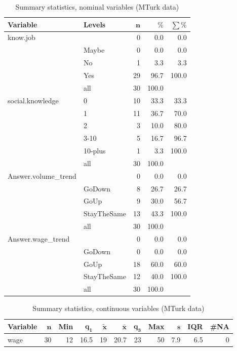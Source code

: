 \documentclass[a4paper,10pt]{article}\usepackage[]{graphicx}\usepackage[]{color}
\begin{document}
\begin{table}[ht]
\centering
{\footnotesize
\begin{tabular}{ll|rrr}
 \textbf{Variable} & \textbf{Levels} & $\mathbf{n}$ & $\mathbf{\%}$ & $\mathbf{\sum \%}$ \\ 
  \hline
know.job &  & 0 & 0.0 & 0.0 \\ 
   & Maybe & 0 & 0.0 & 0.0 \\ 
   & No & 1 & 3.3 & 3.3 \\ 
   & Yes & 29 & 96.7 & 100.0 \\ 
   \hline
 & all & 30 & 100.0 &  \\ 
   \hline
\hline
social.knowledge & 0 & 10 & 33.3 & 33.3 \\ 
   & 1 & 11 & 36.7 & 70.0 \\ 
   & 2 & 3 & 10.0 & 80.0 \\ 
   & 3-10 & 5 & 16.7 & 96.7 \\ 
   & 10-plus & 1 & 3.3 & 100.0 \\ 
   \hline
 & all & 30 & 100.0 &  \\ 
   \hline
\hline
Answer.volume\_trend &  & 0 & 0.0 & 0.0 \\ 
   & GoDown & 8 & 26.7 & 26.7 \\ 
   & GoUp & 9 & 30.0 & 56.7 \\ 
   & StayTheSame & 13 & 43.3 & 100.0 \\ 
   \hline
 & all & 30 & 100.0 &  \\ 
   \hline
\hline
Answer.wage\_trend &  & 0 & 0.0 & 0.0 \\ 
   & GoDown & 0 & 0.0 & 0.0 \\ 
   & GoUp & 18 & 60.0 & 60.0 \\ 
   & StayTheSame & 12 & 40.0 & 100.0 \\ 
   \hline
 & all & 30 & 100.0 &  \\ 
   \hline
\hline
\end{tabular}
}
\caption{Summary statistics, nominal variables (MTurk data)} 
\label{tab1:47-2030}
\end{table}
\begin{table}[ht]
\centering
{\footnotesize
\begin{tabular}{lrrrrrrrrrr}
 \textbf{Variable} & $\mathbf{n}$ & \textbf{Min} & $\mathbf{q_1}$ & $\mathbf{\widetilde{x}}$ & $\mathbf{\bar{x}}$ & $\mathbf{q_3}$ & \textbf{Max} & $\mathbf{s}$ & \textbf{IQR} & \textbf{\#NA} \\ 
  \hline
wage & 30 & 12 & 16.5 & 19 & 20.7 & 23 & 50 & 7.9 & 6.5 & 0 \\ 
  \end{tabular}
}
\caption{Summary statistics, continuous variables (MTurk data)} 
\label{tab2:47-2030}
\end{table}
\end{document}
